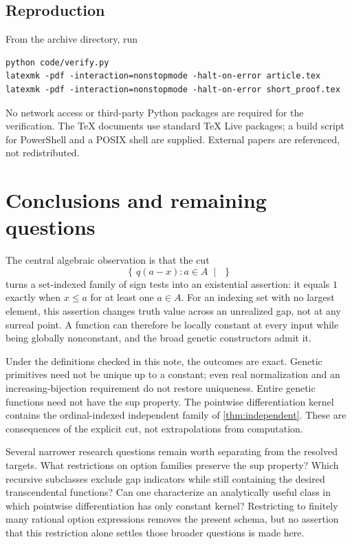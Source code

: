 \documentclass[11pt,letterpaper]{article}
\numberwithin{equation}{section}
\theoremstyle{definition}
\theoremstyle{remark}
\newcommand{\cut}[2]{\left\{\,#1\;\middle|\;#2\,\right\}}
\begin{document}
\subsection{Reproduction}
From the archive directory, run
\begin{verbatim}
python code/verify.py
latexmk -pdf -interaction=nonstopmode -halt-on-error article.tex
latexmk -pdf -interaction=nonstopmode -halt-on-error short_proof.tex
\end{verbatim}
No network access or third-party Python packages are required for the
verification. The TeX documents use standard TeX Live packages; a build
script for PowerShell and a POSIX shell are supplied. External papers are
referenced, not redistributed.

\section{Conclusions and remaining questions}\label{sec:conclusion}
The central algebraic observation is that the cut
\[
 \cut{q(a-x):a\in A}{}
\]
turns a set-indexed family of sign tests into an existential assertion:
it equals $1$ exactly when $x\le a$ for at least one $a\in A$. For an
indexing set with no largest element, this assertion changes truth value
across an unrealized gap, not at any surreal point. A function can
therefore be locally constant at every input while being globally
nonconstant, and the broad genetic constructors admit it.

Under the definitions checked in this note, the outcomes are exact.
Genetic primitives need not be unique up to a constant; even real
normalization and an increasing-bijection requirement do not restore
uniqueness. Entire genetic functions need not have the sup property.
The pointwise differentiation kernel contains the ordinal-indexed
independent family of \cref{thm:independent}. These are consequences of
the explicit cut, not extrapolations from computation.

Several narrower research questions remain worth separating from the
resolved targets. What restrictions on option families preserve the sup
property? Which recursive subclasses exclude gap indicators while still
containing the desired transcendental functions? Can one characterize
an analytically useful class in which pointwise differentiation has only
constant kernel? Restricting to finitely many rational option expressions
removes the present schema, but no assertion that this restriction alone
settles those broader questions is made here.
\end{document}
